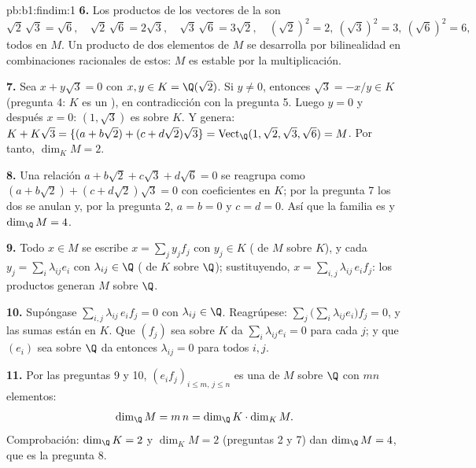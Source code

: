 \begin{solution}{pb:b1:findim:1}
\textbf{6.} Los productos de los vectores de la  son
\[
\sqrt2\,\sqrt3 = \sqrt6,\quad
\sqrt2\,\sqrt6 = 2\sqrt3,\quad
\sqrt3\,\sqrt6 = 3\sqrt2,\quad
(\sqrt2)^2 = 2,\ (\sqrt3)^2 = 3,\ (\sqrt6)^2 = 6,
\]
todos en $M$. Un producto de dos elementos de $M$ se desarrolla por
bilinealidad en combinaciones racionales de estos: $M$ es estable por
la multiplicación.

\textbf{7.} Sea $x + y\sqrt3 = 0$ con $x, y \in K = \Q(\sqrt2)$. Si
$y \neq 0$, entonces $\sqrt3 = -x/y \in K$ (pregunta 4: $K$ es un
), en contradicción con la pregunta 5. Luego $y = 0$ y
después $x = 0$: $(1, \sqrt3)$ es  sobre $K$. Y genera:
$K + K\sqrt3 = \{(a + b\sqrt2) + (c + d\sqrt2)\sqrt3\} =
\operatorname{Vect}_\Q (1, \sqrt2, \sqrt3, \sqrt6) = M$. Por tanto,
$\dim_K M = 2$.

\textbf{8.} Una relación $a + b\sqrt2 + c\sqrt3 + d\sqrt6 = 0$ se
reagrupa como $(a + b\sqrt2) + (c + d\sqrt2)\sqrt3 = 0$ con
coeficientes en $K$; por la pregunta 7 los dos se anulan y, por la
pregunta 2, $a = b = 0$ y $c = d = 0$. Así que la familia es  y
$\dim_\Q M = 4$.

\textbf{9.} Todo $x \in M$ se escribe $x = \sum_j y_j f_j$ con
$y_j \in K$ ( de $M$ sobre $K$), y cada
$y_j = \sum_i \lambda_{ij} e_i$ con $\lambda_{ij} \in \Q$ ( de
$K$ sobre $\Q$); sustituyendo,
$x = \sum_{i,j} \lambda_{ij}\, e_i f_j$: los productos generan $M$
sobre $\Q$.

\textbf{10.} Supóngase $\sum_{i,j} \lambda_{ij}\, e_i f_j = 0$ con
$\lambda_{ij} \in \Q$. Reagrúpese:
$\sum_j \bigl(\sum_i \lambda_{ij} e_i\bigr) f_j = 0$, y las sumas
 están en $K$. Que $(f_j)$ sea  sobre $K$ da
$\sum_i \lambda_{ij} e_i = 0$ para cada $j$; y que $(e_i)$ sea 
sobre $\Q$ da entonces $\lambda_{ij} = 0$ para todos $i, j$.

\textbf{11.} Por las preguntas 9 y 10,
$(e_i f_j)_{i \leq m,\, j \leq n}$ es una  de $M$ sobre $\Q$ con
$mn$ elementos:
\[
\dim_\Q M = m\,n = \dim_\Q K \cdot \dim_K M .
\]
Comprobación: $\dim_\Q K = 2$ y $\dim_K M = 2$ (preguntas 2 y 7) dan
$\dim_\Q M = 4$, que es la pregunta 8.


\end{solution}
